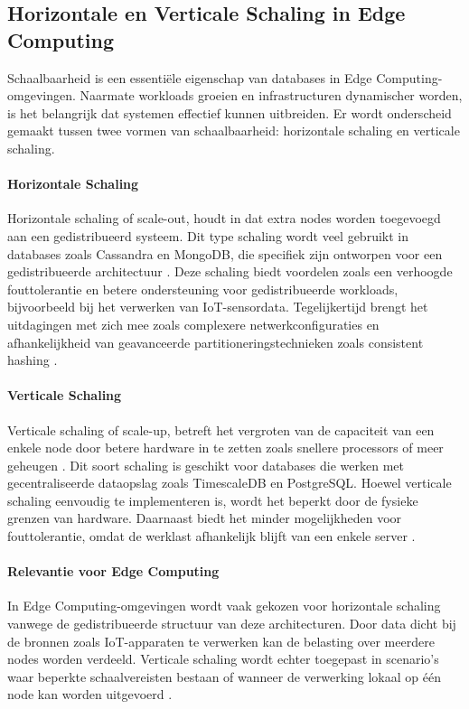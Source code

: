 \subsection{Horizontale en Verticale Schaling in Edge Computing}

Schaalbaarheid is een essentiële eigenschap van databases in Edge Computing-omgevingen. Naarmate workloads groeien en infrastructuren dynamischer worden, is het belangrijk dat systemen effectief kunnen uitbreiden. Er wordt onderscheid gemaakt tussen twee vormen van schaalbaarheid: horizontale schaling en verticale schaling.

\paragraph{Horizontale Schaling}
Horizontale schaling of scale-out, houdt in dat extra nodes worden toegevoegd aan een gedistribueerd systeem. Dit type schaling wordt veel gebruikt in databases zoals Cassandra en MongoDB, die specifiek zijn ontworpen voor een gedistribueerde architectuur \autocite{Kleppmann2017}.  
Deze schaling biedt voordelen zoals een verhoogde fouttolerantie en betere ondersteuning voor gedistribueerde workloads, bijvoorbeeld bij het verwerken van IoT-sensordata. 
Tegelijkertijd brengt het uitdagingen met zich mee zoals complexere netwerkconfiguraties en afhankelijkheid van geavanceerde partitioneringstechnieken zoals consistent hashing \autocite{Mahmud2020}.

\paragraph{Verticale Schaling}
Verticale schaling of scale-up, betreft het vergroten van de capaciteit van een enkele node door betere hardware in te zetten zoals snellere processors of meer geheugen \autocite{Ponnusamy2024}. 
Dit soort schaling is geschikt voor databases die werken met gecentraliseerde dataopslag zoals TimescaleDB en PostgreSQL. 
Hoewel verticale schaling eenvoudig te implementeren is, wordt het beperkt door de fysieke grenzen van hardware. 
Daarnaast biedt het minder mogelijkheden voor fouttolerantie, omdat de werklast afhankelijk blijft van een enkele server \autocite{Mahmud2020}.

\paragraph{Relevantie voor Edge Computing}
In Edge Computing-omgevingen wordt vaak gekozen voor horizontale schaling vanwege de gedistribueerde structuur van deze architecturen. 
Door data dicht bij de bronnen zoals IoT-apparaten te verwerken kan de belasting over meerdere nodes worden verdeeld. 
Verticale schaling wordt echter toegepast in scenario's waar beperkte schaalvereisten bestaan of wanneer de verwerking lokaal op één node kan worden uitgevoerd \autocite{Kleppmann2017}.

